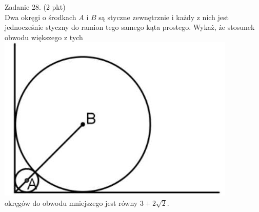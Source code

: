 \documentclass[10pt]{article}
\begin{document}
Zadanie 28. (2 pkt)\\
Dwa okręgi o środkach \(A\) i \(B\) są styczne zewnętrznie i każdy z nich jest jednocześnie styczny do ramion tego samego kąta prostego. Wykaż, że stosunek obwodu większego z tych\\
\includegraphics[max width=\textwidth, center]{2024_11_21_8e981e1ab2c7e641f462g-11}\\
okręgów do obwodu mniejszego jest równy \(3+2 \sqrt{2}\).
\end{document}
